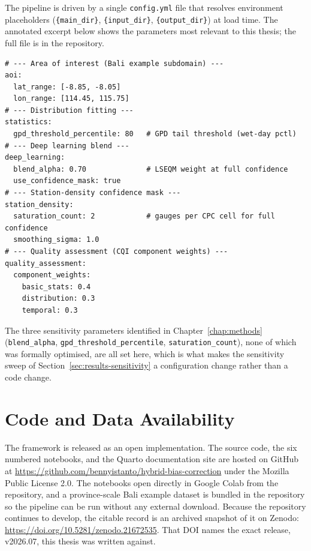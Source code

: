 The pipeline is driven by a single \texttt{config.yml} file that
resolves environment placeholders (\texttt{\{main\_dir\}},
\texttt{\{input\_dir\}}, \texttt{\{output\_dir\}}) at load time.
The annotated excerpt below shows the parameters most relevant to
this thesis; the full file is in the repository.

{\footnotesize
\begin{verbatim}
# --- Area of interest (Bali example subdomain) ---
aoi:
  lat_range: [-8.85, -8.05]
  lon_range: [114.45, 115.75]
# --- Distribution fitting ---
statistics:
  gpd_threshold_percentile: 80   # GPD tail threshold (wet-day pctl)
# --- Deep learning blend ---
deep_learning:
  blend_alpha: 0.70              # LSEQM weight at full confidence
  use_confidence_mask: true
# --- Station-density confidence mask ---
station_density:
  saturation_count: 2            # gauges per CPC cell for full confidence
  smoothing_sigma: 1.0
# --- Quality assessment (CQI component weights) ---
quality_assessment:
  component_weights:
    basic_stats: 0.4
    distribution: 0.3
    temporal: 0.3
\end{verbatim}
}

\enlargethispage{\baselineskip}%
The three sensitivity parameters identified in
Chapter~\ref{chap:methods} (\texttt{blend\_alpha},
\texttt{gpd\_threshold\_percentile}, \texttt{saturation\_count}),
none of which was formally optimised, are all set here, which is
what makes the sensitivity sweep of
Section~\ref{sec:results-sensitivity} a configuration change
rather than a code change.


\chapter{Code and Data Availability}\label{app:code}

The framework is released as an open implementation. The source
code, the six numbered notebooks, and the Quarto documentation
site are hosted on GitHub at
\url{https://github.com/bennyistanto/hybrid-bias-correction}
under the Mozilla Public License 2.0. The notebooks open directly
in Google Colab from the repository, and a province-scale Bali
example dataset is bundled in the repository so the pipeline can be
run without any external download. Because the repository continues
to develop, the citable record is an archived snapshot of it on
Zenodo: \url{https://doi.org/10.5281/zenodo.21672535}. That DOI
names the exact release, v2026.07, this thesis was written against.

